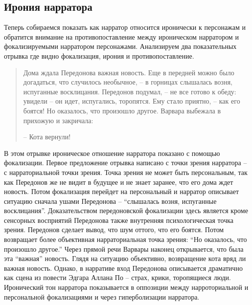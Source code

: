 \documentclass[12pt,a4paper]{article}
\begin{document}




\subsection{Ирония нарратора}



Теперь собираемся показать как нарратор относится иронически к персонажам и обратится внимание на противопоставление между ироническом нарратором и фокализируемыми нарратором персонажами. Анализируем два показательных отрывка где видно фокализация, ирония и противопоставление.

\begin{quote}
Дома ждала Передонова важная новость. Еще в передней можно
было догадаться, что случилось необычное, – в горницах слышалась 
возня, испуганные восклицания. Передонов подумал, – не все
готово к обеду: увидели – он идет, испугались, торопятся. Ему стало
приятно, – как его боятся! Но оказалось, что произошло другое. 
Варвара выбежала в прихожую и закричала:

– Кота вернули!

\parencite[171.]{sologub2004}

\end{quote}

В этом отрывке ироническое отношение нарратора показано с помощью фокализации. Первое предложение отрывка написано с точки зрения нарратора – с нарраториальной точки зрения. Точка зрения не может быть персональным, так как Передонов же не видит в будущее и не знает заранее, что его дома ждет новость. Потом фокализация перейдет на персональный и нарратор описывает ситуацию сначала ушами Передонова – \enquote{слышалась 
возня, испуганные восклицания}. Доказательством передоновской фокализации здесь является кроме сенсорных восприятий Передонова также внутренняя психологическая точка зрения. Передонов сделает вывод, что шум оттого, что его боятся. Потом возвращает более объективная нарраториальная точка зрения: \enquote{Но оказалось, что произошло другое.} Через прямой речи Варвары наконец открывается, что была эта \enquote{важная} новость.
Глядя на ситуацию объективно, возвращение кота вряд ли важная новость. Однако, в нарративе вход Передонова описывается драматично как сцена из повести Эдгара Аллана По – страх, крики, торопящиеся люди. Иронический тон нарратора показывается  в оппозиции между нарроториальной и персональной фокализациями и через гиперболизации нарратора.
\end{document}
